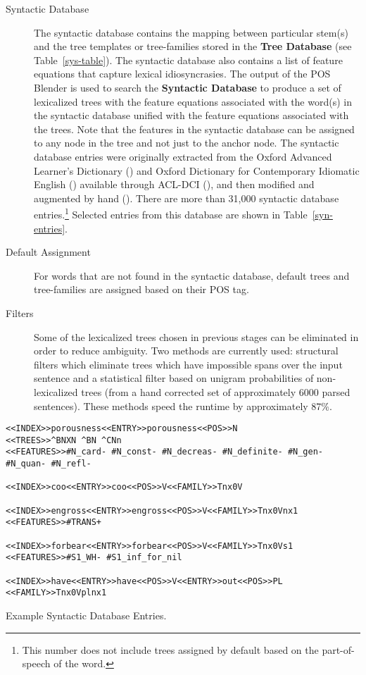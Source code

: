 \begin{description}
\item[Syntactic Database] The syntactic database contains the mapping
  between particular stem(s) and the tree templates or tree-families
  stored in the {\bf Tree Database} (see Table~\ref{sys-table}). The
  syntactic database also contains a list of feature equations that
  capture lexical idiosyncrasies. The output of the POS Blender is
  used to search the {\bf Syntactic Database} to produce a set of
  lexicalized trees with the feature equations associated with the
  word(s) in the syntactic database unified with the feature equations
  associated with the trees. Note that the features in the syntactic
  database can be assigned to any node in the tree and not just to the
  anchor node. The syntactic database entries were originally
  extracted from the Oxford Advanced Learner's Dictionary
  (\cite{oald74}) and Oxford Dictionary for Contemporary Idiomatic
  English (\cite{cie75}) available through ACL-DCI
  (\cite{liberman89}), and then modified and augmented by hand
  (\cite{EgediMartin94}).  There are more than 31,000 syntactic
  database entries.\footnote{This number does not include trees
    assigned by default based on the part-of-speech of the word.}
  Selected entries from this database are shown in
  Table~\ref{syn-entries}.
    
\item[Default Assignment] For words that are not found in the
  syntactic database, default trees and tree-families are assigned
  based on their POS tag.
  
\item[Filters] Some of the lexicalized trees chosen in previous stages
  can be eliminated in order to reduce ambiguity. Two methods are
  currently used: structural filters which eliminate trees which have
  impossible spans over the input sentence and a statistical filter
  based on unigram probabilities of non-lexicalized trees (from a hand
  corrected set of approximately 6000 parsed sentences). These methods
  speed the runtime by approximately 87\%.

\end{description}

\begin{table}[htb]
\begin{verbatim}
<<INDEX>>porousness<<ENTRY>>porousness<<POS>>N
<<TREES>>^BNXN ^BN ^CNn
<<FEATURES>>#N_card- #N_const- #N_decreas- #N_definite- #N_gen- 
#N_quan- #N_refl-

<<INDEX>>coo<<ENTRY>>coo<<POS>>V<<FAMILY>>Tnx0V

<<INDEX>>engross<<ENTRY>>engross<<POS>>V<<FAMILY>>Tnx0Vnx1
<<FEATURES>>#TRANS+

<<INDEX>>forbear<<ENTRY>>forbear<<POS>>V<<FAMILY>>Tnx0Vs1
<<FEATURES>>#S1_WH- #S1_inf_for_nil

<<INDEX>>have<<ENTRY>>have<<POS>>V<<ENTRY>>out<<POS>>PL
<<FAMILY>>Tnx0Vplnx1
\end{verbatim}   
\caption{Example Syntactic Database Entries.}

\label{syn-entries}
\end{table}

